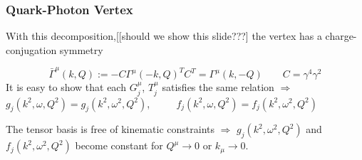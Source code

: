 \begin{frame}\frametitle{Quark-Photon Vertex}
With this decomposition,[[should we show this slide???] the vertex has a charge-conjugation symmetry

\begin{equation}
	\bar{\Gamma}^\mu(k,Q):=-C\Gamma^\mu(-k,Q)^TC^T=\Gamma^\mu(k, -Q) \qquad C=\gamma^4\gamma^2
\end{equation}
\vspace{4mm}
It is easy to show that each $G_j^\mu$, $T_j^\mu$
satisfies the same relation $\Rightarrow$\\ \vspace{3mm} $g_j(k^2, \omega, Q^2)=g_j(k^2, \omega^2, Q^2)$, $\qquad$ $f_j(k^2, \omega, Q^2)=f_j(k^2, \omega^2, Q^2)$\\

\vspace{9mm}

The tensor basis  is free of kinematic constraints $\Rightarrow$ 
\vspace{2mm}
$g_j(k^2, \omega^2,Q^2)$ and $f_j(k^2, \omega^2,Q^2)$ become constant for $Q^\mu\to0$ or $k_\mu\to  0$.

\end{frame}


\endinput
